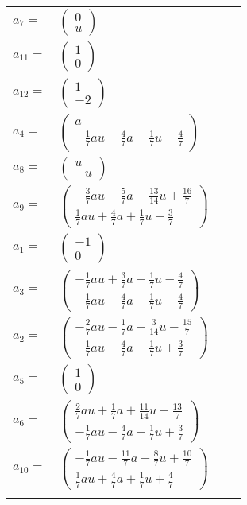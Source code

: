 \documentclass[1p]{elsarticle_modified}
\theoremstyle{definition}
\begin{document}
\begin{tabular}{m{7pt} m{180pt} m{7pt} m{180pt} }
\flushright $a_{7}=$&$\begin{pmatrix}0\\u\end{pmatrix}$ \\
\flushright $a_{11}=$&$\begin{pmatrix}1\\0\end{pmatrix}$ \\
\flushright $a_{12}=$&$\begin{pmatrix}1\\-2\end{pmatrix}$ \\
\flushright $a_{4}=$&$\begin{pmatrix}a\\-\frac{1}{7} a u-\frac{4}{7} a-\frac{1}{7} u-\frac{4}{7}\end{pmatrix}$ \\
\flushright $a_{8}=$&$\begin{pmatrix}u\\- u\end{pmatrix}$ \\
\flushright $a_{9}=$&$\begin{pmatrix}-\frac{3}{7} a u-\frac{5}{7} a-\frac{13}{14} u+\frac{16}{7}\\\frac{1}{7} a u+\frac{4}{7} a+\frac{1}{7} u-\frac{3}{7}\end{pmatrix}$ \\
\flushright $a_{1}=$&$\begin{pmatrix}-1\\0\end{pmatrix}$ \\
\flushright $a_{3}=$&$\begin{pmatrix}-\frac{1}{7} a u+\frac{3}{7} a-\frac{1}{7} u-\frac{4}{7}\\-\frac{1}{7} a u-\frac{4}{7} a-\frac{1}{7} u-\frac{4}{7}\end{pmatrix}$ \\
\flushright $a_{2}=$&$\begin{pmatrix}-\frac{2}{7} a u-\frac{1}{7} a+\frac{3}{14} u-\frac{15}{7}\\-\frac{1}{7} a u-\frac{4}{7} a-\frac{1}{7} u+\frac{3}{7}\end{pmatrix}$ \\
\flushright $a_{5}=$&$\begin{pmatrix}1\\0\end{pmatrix}$ \\
\flushright $a_{6}=$&$\begin{pmatrix}\frac{2}{7} a u+\frac{1}{7} a+\frac{11}{14} u-\frac{13}{7}\\-\frac{1}{7} a u-\frac{4}{7} a-\frac{1}{7} u+\frac{3}{7}\end{pmatrix}$ \\
\flushright $a_{10}=$&$\begin{pmatrix}-\frac{1}{7} a u-\frac{11}{7} a-\frac{8}{7} u+\frac{10}{7}\\\frac{1}{7} a u+\frac{4}{7} a+\frac{1}{7} u+\frac{4}{7}\end{pmatrix}$\\&\end{tabular}
\end{document}
